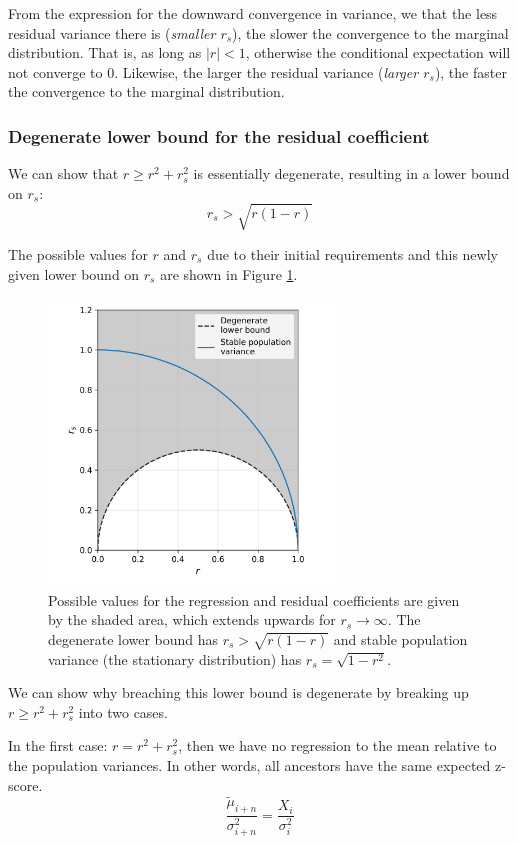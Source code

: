 \documentclass[a4paper,11pt]{article} %
\begin{document}
From the expression for the downward convergence in variance, we that the less residual variance there is (\emph{smaller $r_s$}), the slower the convergence to the marginal distribution. That is, as long as $|r| < 1$, otherwise the conditional expectation will not converge to $0$. Likewise, the larger the residual variance (\emph{larger $r_s$}), the faster the convergence to the marginal distribution. 


\subsubsection*{Degenerate lower bound for the residual coefficient}
We can show that $r \geq r^2 + r_s^2$ is essentially degenerate, resulting in a lower bound on $r_s$:
$$r_s > \sqrt{r(1-r)}$$

The possible values for $r$ and $r_s$ due to their initial requirements and this newly given lower bound on $r_s$ are shown in Figure \ref{fig:possible_r_rs}. 

\begin{figure}[h]
\includegraphics[width=3in]{figures/possible_r_rs.png}
\centering
\caption{Possible values for the regression and residual coefficients are given by the shaded area, which extends upwards for $r_s \rightarrow \infty$. The degenerate lower bound has $r_s > \sqrt{r(1-r)}$ and stable population variance (the stationary distribution) has $r_s = \sqrt{1-r^2}$.}
\label{fig:possible_r_rs}
\end{figure}

We can show why breaching this lower bound is degenerate by breaking up $r \geq r^2 + r_s^2$ into two cases.

In the first case: $r = r^2 + r_s^2$, then we have no regression to the mean relative to the population variances. In other words, all ancestors have the same expected z-score.
$$\frac{\tilde{\mu}_{i+n}}{\sigma_{i+n}^2} = \frac{X_i}{\sigma_i^2}$$
\end{document}
